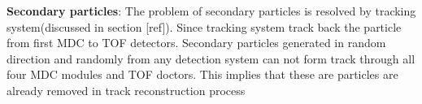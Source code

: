 \textbf{Secondary particles}:
The problem of secondary particles is resolved by tracking system(discussed in section [ref]). Since tracking system track back the particle from first MDC to TOF detectors. Secondary particles generated in random direction and randomly from any detection system can not form track through all four MDC modules and TOF doctors. This implies that these are particles are already removed in track reconstruction process
